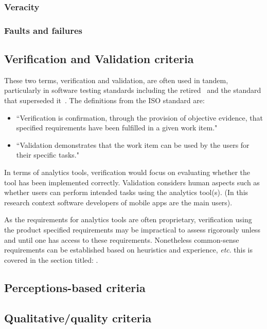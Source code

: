 \subsubsection{Veracity}

\subsubsection{Faults and failures}


\subsection{Verification and Validation criteria}
These two terms, verification and validation, are often used in tandem, particularly in software testing standards including the retired~\cite{BS_7925_1_1998} and the standard that superseded it~\cite{iso29119-1-2013}. The definitions from the ISO standard are:
\begin{itemize}
    \item ``Verification is confirmation, through the provision of objective evidence, that specified requirements have been fulfilled in a given work item."~\cite{iso29119-1-2013}
    \item ``Validation demonstrates that the work item can be used by the users for their specific tasks."~\cite{iso29119-1-2013}
\end{itemize}

In terms of analytics tools, verification would focus on evaluating whether the tool has been implemented correctly. Validation considers human aspects such as whether users can perform intended tasks using the analytics tool(s). (In this research context software developers of mobile apps are the main users).

As the requirements for analytics tools are often proprietary, verification using the product specified requirements may be impractical to assess rigorously unless and until one has access to these requirements. Nonetheless common-sense requirements can be established based on heuristics and experience, \emph{etc}. this is covered in the section titled: \href{rubric-for-evaluating-analytics-tools}{}.

\subsection{Perceptions-based criteria}

\subsection{Qualitative/quality criteria}

